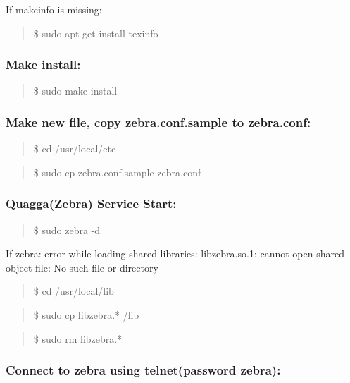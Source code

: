 If makeinfo is missing:

\begin{quote}
\$ sudo apt-get install texinfo
\end{quote}

\subsubsection{Make install:}\label{make-install}

\begin{quote}
\$ sudo make install
\end{quote}

\subsubsection{Make new file, copy zebra.conf.sample to
zebra.conf:}\label{make-new-file-copy-zebra.conf.sample-to-zebra.conf}

\begin{quote}
\$ cd /usr/local/etc
\end{quote}

\begin{quote}
\$ sudo cp zebra.conf.sample zebra.conf
\end{quote}

\subsubsection{Quagga(Zebra) Service
Start:}\label{quaggazebra-service-start}

\begin{quote}
\$ sudo zebra -d
\end{quote}

If zebra: error while loading shared libraries: libzebra.so.1: cannot open shared object file: No such file or directory

\begin{quote}
\$ cd /usr/local/lib
\end{quote}

\begin{quote}
\$ sudo cp libzebra.* /lib
\end{quote}

\begin{quote}
\$ sudo rm libzebra.*
\end{quote}

\subsubsection{Connect to zebra using telnet(password
zebra):}\label{connect-to-zebra-using-telnetpassword-zebra}

